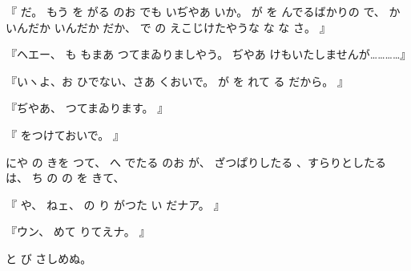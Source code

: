 『
だ。
もう
を
がる
のお
でも
いぢやあ
いか。
が
を
んでるばかりの
で、
かいんだか
いんだか
だか、
で
の
えこじけたやうな
な
な
さ。
』

『ヘエー、
も
もまあ
つてまゐりましやう。
ぢやあ
けもいたしませんが…………』

『いヽよ、お
ひでない、さあ
くおいで。
が
を
れて
る
だから。
』

『ぢやあ、
つてまゐります。
』

『
をつけておいで。
』

にや
の
きを
つて、
へ
でたる
のお
が、
ざつぱりしたる
、すらりとしたる
は、
ち
の
の
を
きて、

『
や、
ねェ、
の
り
がつた
い
だナア。
』

『ウン、
めて
りてえナ。
』

と
び
さしめぬ。

